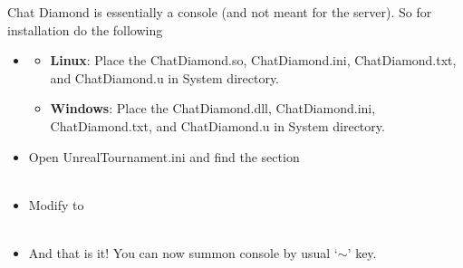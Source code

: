 \documentclass{article}
\theoremstyle{definition}
\newcommand{\FileColor}[1]{{\color{Purple} #1}}
\newcommand{\FolderColor}[1]{{\color{mygray} #1}}
\begin{document}
Chat Diamond is essentially a console (and not meant for the server).  So for installation do the following
\begin{itemize}
\item
    \begin{itemize}
    \item \textbf{Linux}: Place the \FileColor{ChatDiamond.so}, \FileColor{ChatDiamond.ini}, \FileColor{ChatDiamond.txt}, and \FileColor{ChatDiamond.u} in \FolderColor{System}        directory.
    \item \textbf{Windows}: Place the \FileColor{ChatDiamond.dll}, \FileColor{ChatDiamond.ini}, \FileColor{ChatDiamond.txt}, and \FileColor{ChatDiamond.u} in \FolderColor{System} directory.
    \end{itemize}
\item Open \FileColor{UnrealTournament.ini} and find the section \\

\\

\item Modify to \\

\\

\item And that is it!  You can now summon console by usual `$\sim$' key.


\end{itemize}
\end{document}
